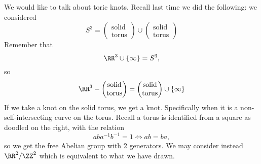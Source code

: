 We would like to talk about toric knots. Recall last time we did
the following: we considered
\begin{equation}
S^3=\begin{pmatrix}\mbox{solid}\\ \mbox{torus}
\end{pmatrix}\cup\begin{pmatrix}\mbox{solid}\\ \mbox{torus}\end{pmatrix}
\end{equation}
Remember that
\begin{equation}
\RR^3\cup\{\infty\}=S^3,
\end{equation}
so
\begin{equation}
\RR^3-\begin{pmatrix}\mbox{solid}\\ \mbox{torus}\end{pmatrix}
=\begin{pmatrix}\mbox{solid}\\ \mbox{torus}\end{pmatrix}\cup\{
\infty\}
\end{equation}
If we take a knot on the solid torus, we get a knot.
Specifically when it is a non-self-intersecting curve on the
torus. Recall a torus is identified from a square as doodled on
the right, with the
relation
\begin{equation}
aba^{-1}b^{-1}=1\iff ab=ba,
\end{equation}
so we get the free Abelian group with 2 generators. We may
consider instead $\RR^2/\ZZ^2$ which is equivalent to what we
have drawn.

